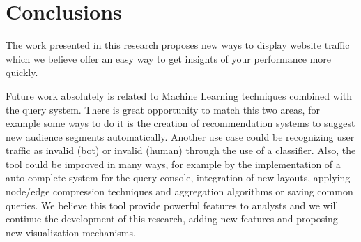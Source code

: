 \documentclass[preprint,12pt,3p]{elsarticle}
\begin{document}
\section{Conclusions}
The work presented in this research proposes new ways to display website traffic which we believe offer an easy way to get insights of your performance more quickly. 

Future work absolutely is related to Machine Learning techniques combined with the query system. There is great opportunity to match this two areas, for example some ways to do it is the creation of recommendation systems to suggest new audience segments automatically. Another use case could be recognizing user traffic as invalid (bot) or invalid (human) through the use of a classifier.
Also, the tool could be improved in many ways, for example by the implementation of a auto-complete system for the query console, integration of new layouts, applying node/edge compression techniques and aggregation algorithms or saving common queries. We believe this tool provide powerful features to analysts and we will continue the development of this research, adding new features and proposing new visualization mechanisms.






% 
% 
% 
% 
% 
% 
% 
% 
% 
% 
% 
% 


\end{document}
